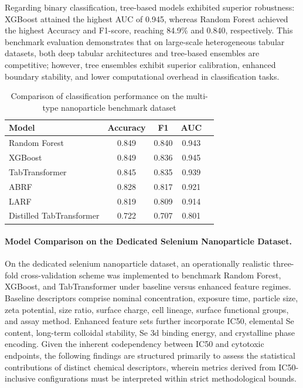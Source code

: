 \documentclass[letterpaper]{article}
\begin{document}
Regarding binary classification, tree-based models exhibited superior robustness: XGBoost attained the highest AUC of 0.945, whereas Random Forest achieved the highest Accuracy and F1-score, reaching 84.9\% and 0.840, respectively. This benchmark evaluation demonstrates that on large-scale heterogeneous tabular datasets, both deep tabular architectures and tree-based ensembles are competitive; however, tree ensembles exhibit superior calibration, enhanced boundary stability, and lower computational overhead in classification tasks.

\begin{table}[htbp]
  \centering
  \caption{Comparison of classification performance on the multi-type nanoparticle benchmark dataset}
  \label{tab:benchmark_classification}
  \begin{tabular}{lcccc}
    \hline
    Model & Accuracy & F1 & AUC \\
    \hline
    Random Forest & 0.849 & 0.840 & 0.943 \\
    XGBoost & 0.849 & 0.836 & 0.945 \\
    TabTransformer & 0.845 & 0.835 & 0.939 \\
    ABRF & 0.828 & 0.817 & 0.921 \\
    LARF & 0.819 & 0.809 & 0.914 \\
    Distilled TabTransformer & 0.722 & 0.707 & 0.801 \\
    \hline
  \end{tabular}
\end{table}

\paragraph{Model Comparison on the Dedicated Selenium Nanoparticle Dataset.}
On the dedicated selenium nanoparticle dataset, an operationally realistic three-fold cross-validation scheme was implemented to benchmark Random Forest, XGBoost, and TabTransformer under baseline versus enhanced feature regimes. Baseline descriptors comprise nominal concentration, exposure time, particle size, zeta potential, size ratio, surface charge, cell lineage, surface functional groups, and assay method. Enhanced feature sets further incorporate IC50, elemental Se content, long-term colloidal stability, Se 3d binding energy, and crystalline phase encoding. Given the inherent codependency between IC50 and cytotoxic endpoints, the following findings are structured primarily to assess the statistical contributions of distinct chemical descriptors, wherein metrics derived from IC50-inclusive configurations must be interpreted within strict methodological bounds.
\end{document}
